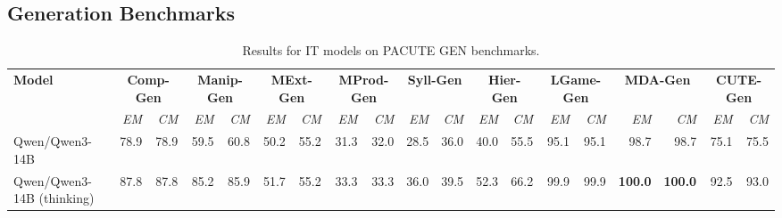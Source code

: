 \documentclass{article}
\begin{document}
\subsection*{Generation Benchmarks}

\begin{table}[htbp]
\centering
\caption{Results for IT models on PACUTE GEN benchmarks.}
\label{tab:results-it:gen}
\begin{threeparttable}
\begin{adjustbox}{max width=\textwidth}
\begin{tabular}{lrrrrrrrrrrrrrrrrrr}
\toprule
\textbf{Model} & \multicolumn{2}{c}{\textbf{Comp-Gen}} & \multicolumn{2}{c}{\textbf{Manip-Gen}} & \multicolumn{2}{c}{\textbf{MExt-Gen}} & \multicolumn{2}{c}{\textbf{MProd-Gen}} & \multicolumn{2}{c}{\textbf{Syll-Gen}} & \multicolumn{2}{c}{\textbf{Hier-Gen}} & \multicolumn{2}{c}{\textbf{LGame-Gen}} & \multicolumn{2}{c}{\textbf{MDA-Gen}} & \multicolumn{2}{c}{\textbf{CUTE-Gen}} \\
\cmidrule(lr){2-3}\cmidrule(lr){4-5}\cmidrule(lr){6-7}\cmidrule(lr){8-9}\cmidrule(lr){10-11}\cmidrule(lr){12-13}\cmidrule(lr){14-15}\cmidrule(lr){16-17}\cmidrule(lr){18-19}
 & \textit{EM} & \textit{CM} & \textit{EM} & \textit{CM} & \textit{EM} & \textit{CM} & \textit{EM} & \textit{CM} & \textit{EM} & \textit{CM} & \textit{EM} & \textit{CM} & \textit{EM} & \textit{CM} & \textit{EM} & \textit{CM} & \textit{EM} & \textit{CM} \\
\midrule
Qwen/Qwen3-14B & \cellcolor[HTML]{D0E6F0}78.9 & \cellcolor[HTML]{D0E6F0}78.9 & \cellcolor[HTML]{EBF4F9}59.5 & \cellcolor[HTML]{EAF4F8}60.8 & \cellcolor[HTML]{FEFDFC}50.2 & \cellcolor[HTML]{FCFDFE}55.2 & \cellcolor[HTML]{FBFDFE}31.3 & \cellcolor[HTML]{FAFCFD}32.0 & \cellcolor[HTML]{F0F7FA}28.5 & \cellcolor[HTML]{FFFFFF}36.0 & \cellcolor[HTML]{F9FBFD}40.0 & \cellcolor[HTML]{E1EFF6}55.5 & \cellcolor[HTML]{9ECBE1}95.1 & \cellcolor[HTML]{9ECBE1}95.1 & \cellcolor[HTML]{94C6DE}98.7 & \cellcolor[HTML]{94C6DE}98.7 & \cellcolor[HTML]{C5E0ED}75.1 & \cellcolor[HTML]{C5E0ED}75.5 \\
Qwen/Qwen3-14B (thinking) & \cellcolor[HTML]{A2CDE3}87.8 & \cellcolor[HTML]{A2CDE3}87.8 & \cellcolor[HTML]{A9D1E5}85.2 & \cellcolor[HTML]{A8D0E4}85.9 & \cellcolor[HTML]{FBFDFD}51.7 & \cellcolor[HTML]{FCFDFE}55.2 & \cellcolor[HTML]{F2F8FB}33.3 & \cellcolor[HTML]{F4F9FB}33.3 & \cellcolor[HTML]{CDE4F0}36.0 & \cellcolor[HTML]{E8F3F8}39.5 & \cellcolor[HTML]{B9D9E9}52.3 & \cellcolor[HTML]{AAD2E5}66.2 & \cellcolor[HTML]{92C5DE}99.9 & \cellcolor[HTML]{92C5DE}99.9 & \cellcolor[HTML]{92C5DE}\textbf{100.0} & \cellcolor[HTML]{92C5DE}\textbf{100.0} & \cellcolor[HTML]{99C9E0}92.5 & \cellcolor[HTML]{9AC9E0}93.0 \\

\end{tabular}
\end{adjustbox}
\end{threeparttable}
\end{table}
\end{document}

